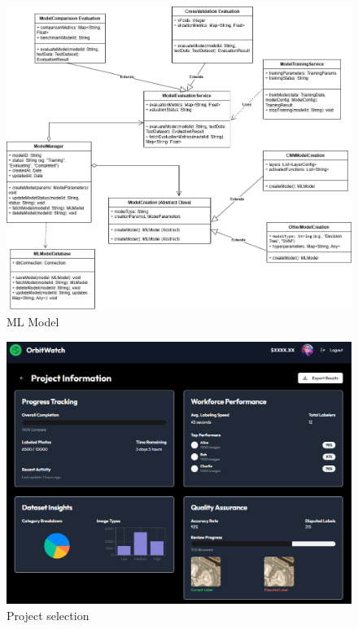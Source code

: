 \documentclass[12pt, titlepage]{article}
\begin{document}
  \begin{figure}[H]
    \centering
    \includegraphics[width=1\textwidth]{Analysis_Class_Diagram_Model.png}
    \caption{ML Model}
    \label{FigUH}
  \end{figure}

  \begin{figure}[H]
    \centering
    \includegraphics[width=1\textwidth]{project_stats.png}
    \caption{Project selection}
    \label{FigUH}
  \end{figure}
  
  
\end{document}
